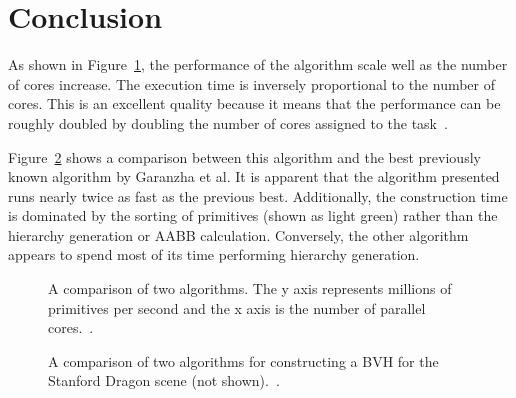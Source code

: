 \documentclass{sig-alternate}
\begin{document}
%



\section{Conclusion}
\label{sec:conclusion}

As shown in Figure~\ref{fig:RadixCores}, the performance of the algorithm scale well as the number of cores increase. The execution time is inversely proportional to the number of cores. This is an excellent quality because it means that the performance can be roughly doubled by doubling the number of cores assigned to the task~\cite{Karras:2012}.

Figure~\ref{fig:RadixPerformance} shows a comparison between this algorithm and the best previously known algorithm by Garanzha et al. It is apparent that the algorithm presented runs nearly twice as fast as the previous best. Additionally, the construction time is dominated by the sorting of primitives (shown as light green) rather than the hierarchy generation or AABB calculation. Conversely, the other algorithm appears to spend most of its time performing hierarchy generation.

\begin{figure}
\centering
{}
\caption{A comparison of two algorithms. The y axis represents millions of primitives per second and the x axis is the number of parallel cores.~\cite{Karras:2012}.}
\label{fig:RadixCores}
\end{figure}

\begin{figure}
\centering
{}
\caption{A comparison of two algorithms for constructing a BVH for the Stanford Dragon scene (not shown).~\cite{Karras:2012}.}
\label{fig:RadixPerformance}
\end{figure}
\end{document}
